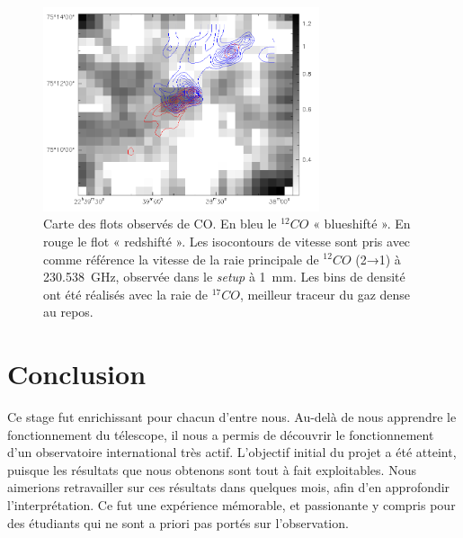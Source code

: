 \documentclass[a4paper,10pt,french]{article}
\newcommand{\setup}{\textit{setup}}
\newcommand{\unmm}{\SI{1}{\milli\meter}}
\begin{document}
\begin{figure}[ht]
    \centering
    \includegraphics[height=6cm]{mapC17O.png}
    \caption{
        Carte des flots observés de CO. En bleu le $^{12}CO$ « blueshifté ». En
        rouge le flot « redshifté ». Les isocontours de vitesse sont pris avec
        comme référence la vitesse de la raie principale de $^{12}CO$ (2→1) à
        \SI{230.538}{\giga\hertz}, observée dans le \setup{} à \unmm. Les bins
        de densité ont été réalisés avec la raie de $^{17}CO$, meilleur traceur
        du gaz dense au repos.
    }
    \label{mapC17O}
\end{figure}

\section*{Conclusion}




Ce stage fut enrichissant pour chacun d'entre nous. Au-delà de nous apprendre le fonctionnement du télescope, il nous a permis de découvrir le fonctionnement d'un observatoire international très actif. L'objectif initial du projet a été atteint, puisque les résultats que nous obtenons sont tout à fait exploitables. Nous aimerions retravailler sur ces résultats dans quelques mois, afin d'en approfondir l'interprétation. 
Ce fut une expérience mémorable, et passionante y compris pour des étudiants qui ne sont a priori pas portés sur l'observation.
\end{document}
